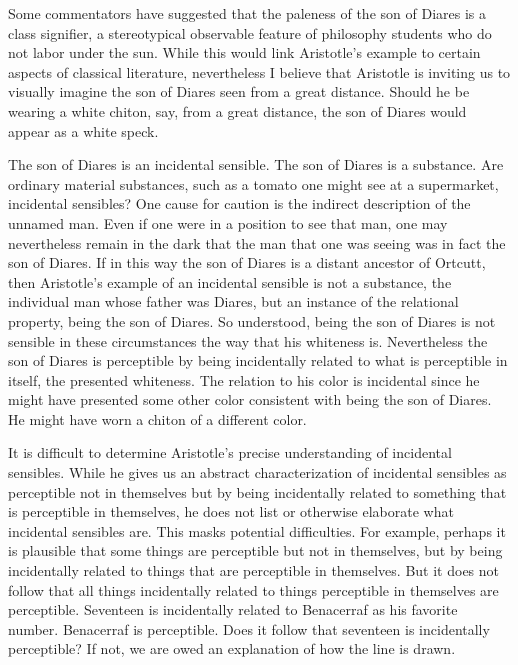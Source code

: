 Some commentators have suggested that the paleness of the son of Diares is a class signifier, a stereotypical observable feature of philosophy students who do not labor under the sun. While this would link Aristotle's example to certain aspects of classical literature, nevertheless I believe that Aristotle is inviting us to visually imagine the son of Diares seen from a great distance. Should he be wearing a white chiton, say, from a great distance, the son of Diares would appear as a white speck. 

The son of Diares is an incidental sensible. The son of Diares is a substance. Are ordinary material substances, such as a tomato one might see at a supermarket, incidental sensibles? One cause for caution is the indirect description of the unnamed man. Even if one were in a position to see that man, one may nevertheless remain in the dark that the man that one was seeing was in fact the son of Diares. If in this way the son of Diares is a distant ancestor of Ortcutt, then Aristotle's example of an incidental sensible is not a substance, the individual man whose father was Diares, but an instance of the relational property, being the son of Diares. So understood, being the son of Diares is not sensible in these circumstances the way that his whiteness is. Nevertheless the son of Diares is perceptible by being incidentally related to what is perceptible in itself, the presented whiteness. The relation to his color is incidental since he might have presented some other color consistent with being the son of Diares. He might have worn a chiton of a different color.

It is difficult to determine Aristotle's precise understanding of incidental sensibles. While he gives us an abstract characterization of incidental sensibles as perceptible not in themselves but by being incidentally related to something that is perceptible in themselves, he does not list or otherwise elaborate what incidental sensibles are. This masks potential difficulties. For example, perhaps it is plausible that some things are perceptible but not in themselves, but by being incidentally related to things that are perceptible in themselves. But it does not follow that all things incidentally related to things perceptible in themselves are perceptible. Seventeen is incidentally related to Benacerraf as his favorite number. Benacerraf is perceptible. Does it follow that seventeen is incidentally perceptible? If not, we are owed an explanation of how the line is drawn.

